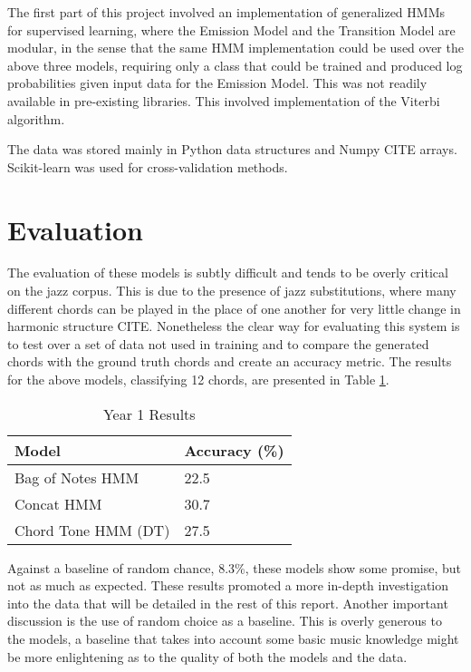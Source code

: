 \documentclass[bsc,logo,twoside,singlespacing,parskip,deptreport]{infthesis}
\begin{document}
The first part of this project involved an implementation of generalized HMMs for supervised learning, where the Emission Model and the Transition Model are modular, in the sense that the same HMM implementation could be used over the above three models, requiring only a class that could be trained and produced log probabilities given input data for the Emission Model. This was not readily available in pre-existing libraries. This involved implementation of the Viterbi algorithm.

The data was stored mainly in Python data structures and Numpy CITE arrays. Scikit-learn was used for cross-validation methods.

\section{Evaluation}

The evaluation of these models is subtly difficult and tends to be overly critical on the jazz corpus. This is due to the presence of jazz substitutions, where many different chords can be played in the place of one another for very little change in harmonic structure CITE. Nonetheless the clear way for evaluating this system is to test over a set of data not used in training and to compare the generated chords with the ground truth chords and create an accuracy metric. The results for the above models, classifying 12 chords, are presented in Table \ref{12}.

\begin{table}
\centering
\caption{Year 1 Results}
\label{12}
\begin{tabular}{l|l}
Model               & Accuracy (\%) \\ \hline
Bag of Notes HMM    & 22.5           \\
Concat HMM          & 30.7          \\
Chord Tone HMM (DT) & 27.5          \\
\end{tabular}
\end{table}

Against a baseline of random chance, 8.3\%, these models show some promise, but not as much as expected. These results promoted a more in-depth investigation into the data that will be detailed in the rest of this report. Another important discussion is the use of random choice as a baseline. This is overly generous to the models, a baseline that takes into account some basic music knowledge might be more enlightening as to the quality of both the models and the data.
\end{document}
